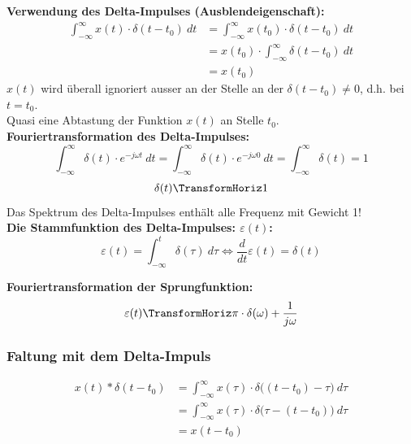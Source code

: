 \documentclass[12pt,a4paper]{scrartcl}
\begin{document}
  \noindent  \textbf{Verwendung des Delta-Impulses (Ausblendeigenschaft):}
  \begin{equation}
    \label{eq:9}
    \begin{split}
    \int_{-\infty}^{\infty} x(t) \cdot \delta(t-t_0)\ d t &= \int_{-\infty}^{\infty} x(t_0) \cdot \delta (t-t_0)\ d t \\    
    &= x(t_0) \cdot \int_{-\infty}^{\infty} \delta (t-t_0)\ dt \\
    &=x(t_0)
    \end{split}
    \end{equation}
    \noindent $x(t)$ wird überall ignoriert ausser an der Stelle an der $\delta(t-t_0) \neq 0$, d.h. bei $t = t_0$.\\
    Quasi eine Abtastung der Funktion $x(t)$ an Stelle $t_0$.\\

    \noindent \textbf{Fouriertransformation des Delta-Impulses:}
    $$\int_{-\infty}^{\infty} \delta(t) \cdot e^{-j\omega t}\ dt = \int_{-\infty}^{\infty} \delta(t) \cdot e^{-j\omega 0}\ dt = \int_{-\infty}^{\infty} \delta(t) = 1$$
    $$\delta(t) \TransformHoriz 1 $$ 
    Das Spektrum des Delta-Impulses enthält alle Frequenz mit Gewicht 1! \\

    \noindent \textbf{Die Stammfunktion des Delta-Impulses: $\varepsilon(t)$:}
    $$\varepsilon (t) = \int_{-\infty}^{t} \delta(\tau)\ d \tau \Leftrightarrow  \frac{d}{dt} \varepsilon (t) = \delta (t) $$

     \noindent \textbf{Fouriertransformation der Sprungfunktion:}
     $$\varepsilon(t) \TransformHoriz \pi \cdot \delta(\omega) + \frac{1}{j\omega} $$

  \subsubsection{Faltung mit dem Delta-Impuls}
  \label{sec:sub:sub:faltung-mit-delta-impuls}

  \begin{equation}
    \label{eq:10}
    \begin{split}
    x(t) * \delta(t-t_0) &= \int_{-\infty}^{\infty} x(\tau) \cdot \delta\big((t-t_0) - \tau\big)\ d \tau  \\
    &= \int_{-\infty}^{\infty} x(\tau) \cdot \delta \big(\tau -(t-t_0)\big)\ d \tau \\    
    &=x(t - t_0)
    \end{split}
    \end{equation}
\end{document}
